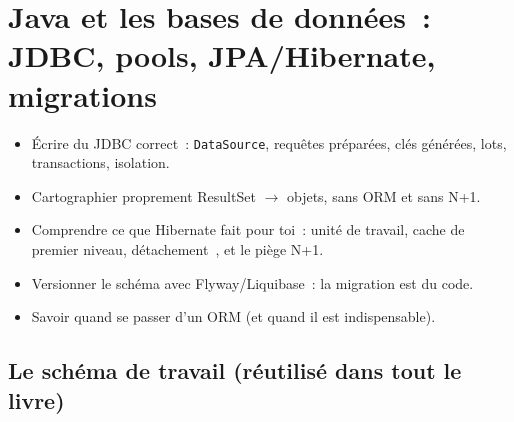 \chapter{Java et les bases de donn\'ees~: JDBC, pools, JPA/Hibernate, migrations}
\label{ch-java-db}

\begin{objectif}
\begin{itemize}
  \item \'Ecrire du JDBC correct~: \texttt{DataSource}, requ\^etes pr\'epar\'ees, cl\'es g\'en\'er\'ees, lots,
        transactions, isolation.
  \item Cartographier proprement ResultSet $\rightarrow$ objets, sans ORM et sans N+1.
  \item Comprendre ce que Hibernate fait pour toi~: unit\'e de travail, cache de premier niveau,
        \og d\'etachement~\fg{}, et le pi\`ege N+1.
  \item Versionner le sch\'ema avec Flyway/Liquibase~: la migration est du code.
  \item Savoir quand se passer d'un ORM (et quand il est indispensable).
\end{itemize}
\end{objectif}

\section{Le sch\'ema de travail (r\'eutilis\'e dans tout le livre)}

